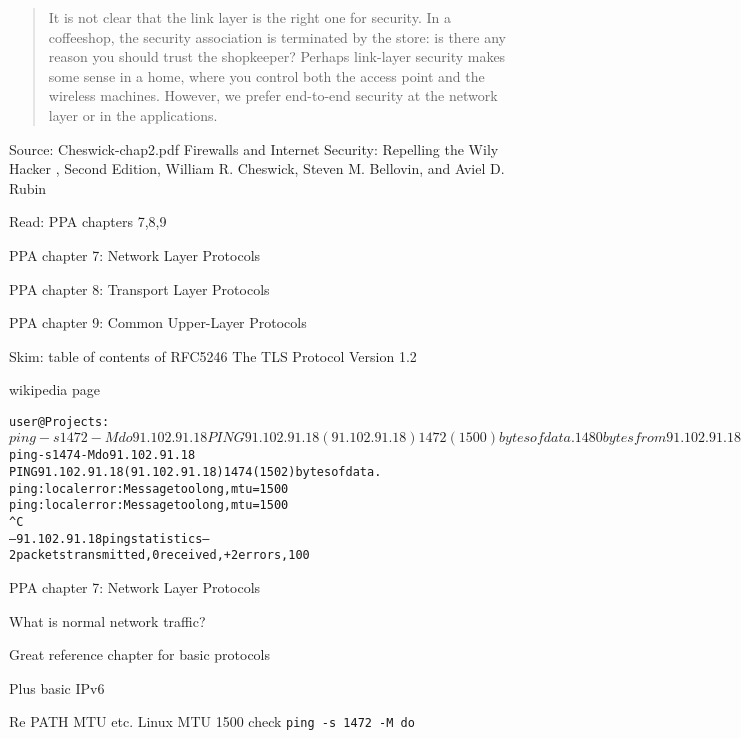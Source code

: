 \documentclass[Screen16to9,17pt]{foils}
\begin{document}

\begin{quote}
It is not clear that the link layer is the right one for security. In a coffeeshop, the security association is terminated by the store: is there any reason you should trust the shopkeeper? Perhaps link-layer security makes some sense in a home, where you control both the access point and the wireless machines. However, we prefer end-to-end security at the network layer or in the
applications.
\end{quote} Source: Cheswick-chap2.pdf Firewalls and Internet Security: Repelling the Wily Hacker , Second Edition, William R. Cheswick, Steven M. Bellovin, and Aviel D. Rubin



\begin{list2}
\item Read: PPA chapters 7,8,9
\item PPA chapter 7: Network Layer Protocols
\item PPA chapter 8: Transport Layer Protocols
\item PPA chapter 9: Common Upper-Layer Protocols
\item Skim: table of contents of RFC5246 The TLS Protocol Version 1.2
\item wikipedia page 
\end{list2}



\begin{alltt}\footnotesize
user@Projects:~$ ping -s 1472 -M do 91.102.91.18
PING 91.102.91.18 (91.102.91.18) 1472(1500) bytes of data.
1480 bytes from 91.102.91.18: icmp_seq=1 ttl=244 time=7.43 ms
1480 bytes from 91.102.91.18: icmp_seq=2 ttl=244 time=7.20 ms
...
user@Projects:~$ ping -s 1474 -M do 91.102.91.18
PING 91.102.91.18 (91.102.91.18) 1474(1502) bytes of data.
ping: local error: Message too long, mtu=1500
ping: local error: Message too long, mtu=1500
^C
--- 91.102.91.18 ping statistics ---
2 packets transmitted, 0 received, +2 errors, 100% packet loss, time 1025ms
\end{alltt}

\begin{list1}
\item PPA chapter 7: Network Layer Protocols
\begin{list2}
\item What is normal network traffic?
\item Great reference chapter for basic protocols
\item Plus basic IPv6
\item Re PATH MTU etc. Linux MTU 1500 check \verb+ping -s 1472 -M do+
\end{list2}
\end{list1}
\end{document}
